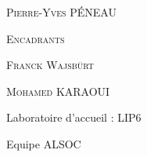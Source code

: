 \begin{titlepage}
  {\begin{center}\huge\textsc{Pierre-Yves PÉNEAU}\end{center}}
  
  \vspace{0.4cm}
  
  {\begin{center}\Large\textsc{Encadrants}\end{center}}
  
  {\begin{center}\huge\textsc{Franck Wajsbürt}\end{center}}
  
  {\begin{center}\huge\textsc{Mohamed KARAOUI}\end{center}}
  
  {\begin{center}\large\textsf{Laboratoire d'accueil : LIP6 }\end{center}}
  
  {\begin{center}\large\textsf{Equipe ALSOC}\end{center}}
  
\end{titlepage}
